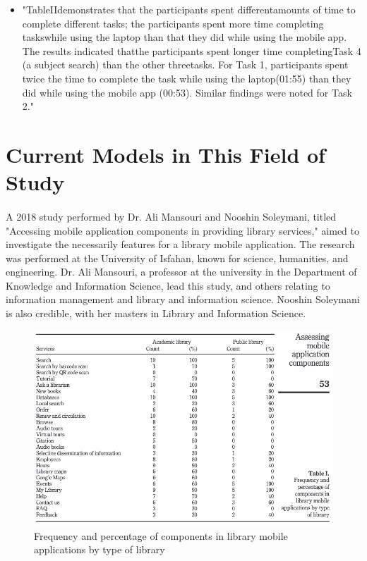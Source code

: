 \begin{itemize}
        \item 
        "TableIIdemonstrates that the participants spent differentamounts of time to complete different tasks; the participants spent more time completing taskswhile using the laptop than that they did while using the mobile app. The results indicated thatthe participants spent longer time completingTask 4 (a subject search) than the other threetasks. For Task 1, participants spent twice the time to complete the task while using the laptop(01:55) than they did while using the mobile app (00:53). Similar findings were noted for Task 2." \cite{given_one}
    \end{itemize}
    
    
\section{Current Models in This Field of Study}
    \paragraph{}
    A 2018 study performed by Dr. Ali Mansouri and Nooshin Soleymani, titled "Accessing mobile application components in providing library services," aimed to investigate the necessarily features for a library mobile application. The research was performed at the University of Isfahan, known for science, humanities, and engineering. Dr. Ali Mansouri, a professor at the university in the Department of Knowledge and Information Science, lead this study, and others relating to information management and library and information science. Nooshin Soleymani is also credible, with her masters in Library and Information Science.
    \begin{figure}[H]
        \centering
        \includegraphics[width = \textwidth, height = \textheight, keepaspectratio]{assets/img/accessing_mobile_application_components_table_1.png}
        \caption{Frequency and percentage of components in library mobile applications by type of library \cite{mansouri_soleymani_asl_2019}}
        \label{fig:freq_and_per_comp_lib_mob_app}
    \end{figure}
